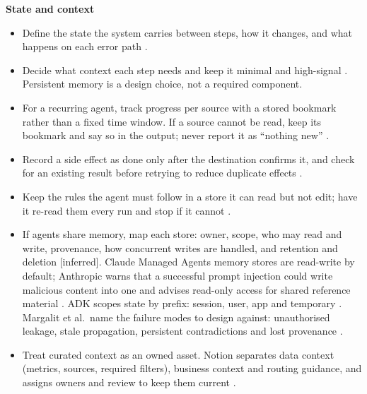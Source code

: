 \documentclass[10pt]{article}
\newcommand{\inferred}{\textsf{\small[inferred]}}
\begin{document}
\textbf{State and context}
\begin{itemize}
\item Define the state the system carries between steps, how it changes, and what happens on each error path \cite[steps~3--4]{langgraph}.
\item Decide what context each step needs and keep it minimal and high-signal \cite{anthcontext}. Persistent memory is a design choice, not a required component.
\item For a recurring agent, track progress per source with a stored bookmark rather than a fixed time window. If a source cannot be read, keep its bookmark and say so in the output; never report it as ``nothing new'' \cite[Sources]{anthauto}.
\item Record a side effect as done only after the destination confirms it, and check for an existing result before retrying to reduce duplicate effects \cite[Destination]{anthauto}.
\item Keep the rules the agent must follow in a store it can read but not edit; have it re-read them every run and stop if it cannot \cite[Memory]{anthauto}.
\item If agents share memory, map each store: owner, scope, who may read and write, provenance, how concurrent writes are handled, and retention and deletion \inferred. Claude Managed Agents memory stores are read-write by default; Anthropic warns that a successful prompt injection could write malicious content into one and advises read-only access for shared reference material \cite[access section]{mamemory}. ADK scopes state by prefix: session, user, app and temporary \cite[``Organizing State with Prefixes'']{adkstate}. Margalit et al.\ name the failure modes to design against: unauthorised leakage, stale propagation, persistent contradictions and lost provenance \cite[\S4, p.~4]{margalit}.
\item Treat curated context as an owned asset. Notion separates data context (metrics, sources, required filters), business context and routing guidance, and assigns owners and review to keep them current \cite[``Connecting data and business context'', ``Keeping data and business context current'']{notion}.
\end{itemize}
\end{document}
